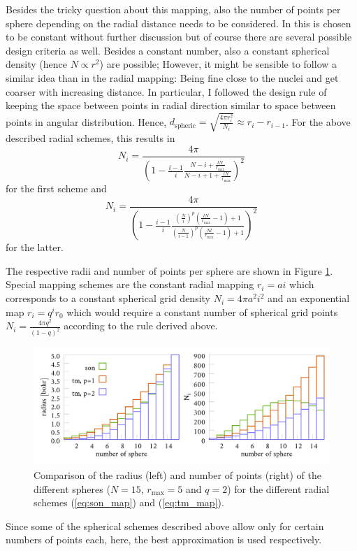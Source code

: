 Besides the tricky question about this mapping, also the number of points per sphere depending on the radial distance needs to be considered. 
In \cite{Son_Chu0} this is chosen to be constant without further discussion but of course there are several possible design criteria as well.
Besides a constant number, also a constant spherical density (hence $N\propto r^2$) are possible; However, it might be sensible to follow a similar idea than in the radial mapping: Being fine close to the nuclei and get coarser with increasing distance.
In particular, I followed the design rule of keeping the space between points in radial direction similar to space between points in angular distribution.
Hence, $d_\text{spheric}=\sqrt{\frac{4\pi r_i^2}{N_i}}\approx r_i-r_{i-1}$.
For the above described radial schemes, this results in 
\begin{equation}\label{eq:tm_num}
N_i= \frac{4\pi}{ \left(1-\frac{i-1 }{i}\frac{N-i+\frac{lN}{r_\text{max}}}{N-i+1+\frac{lN}{r_\text{max}}}\right)^2 }
\end{equation}
for the first scheme and 
\begin{equation} \label{eq:son_num}
N_i= \frac{4\pi}{\left(1-\frac{i-1 }{i}\frac{ (\frac{N}{i})^p \left(\frac{lN}{r_\text{max}}-1\right)+1}{ (\frac{N}{i-1})^p\left( \frac{Nl}{r_\text{max}} -1 \right) +1 } \right)^2 }
\end{equation}
for the latter.

The respective radii and number of points per sphere are shown in Figure \ref{fig:maps}.\\
Special mapping schemes are the constant radial mapping $r_i=a i$ which corresponds to a constant spherical grid density $N_i=4\pi a^2 i^2$ and an exponential map $r_i=q^i r_0$ which would require a constant number of spherical grid points $N_i=\frac{4\pi q^2}{(1-q)^2}$ according to the rule derived above.

\begin{figure}
\includegraphics[width=\textwidth]{Data/radial_mapping}
\caption{Comparison of the radius (left) and number of points (right) of the different spheres ($N=15$, $r_\text{max}=5$ and $q=2$) for the different radial schemes (\ref{eq:son_map}) and (\ref{eq:tm_map}).}
\label{fig:maps}
\end{figure}

Since some of the spherical schemes described above allow only for certain numbers of points each, here, the best approximation is used respectively.
